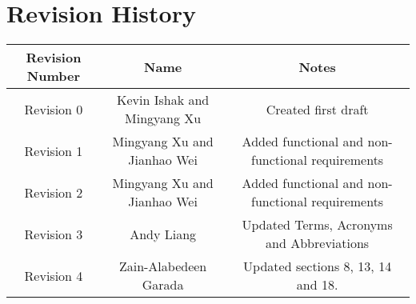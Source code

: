 \documentclass{article}
\begin{document}
\section{Revision History}
\begin{tabular}{|c|c|c|}
\hline
\textbf{Revision Number} & \textbf{Name} & \textbf{Notes} \\
\hline
Revision 0 & Kevin Ishak and Mingyang Xu & Created first draft \\
Revision 1 & Mingyang Xu and Jianhao Wei & Added functional and non-functional requirements \\
Revision 2 & Mingyang Xu and Jianhao Wei & Added functional and non-functional requirements \\
Revision 3 & Andy Liang & Updated Terms, Acronyms and Abbreviations \\
Revision 4 & Zain-Alabedeen Garada & Updated sections 8, 13, 14 and 18.\\
\hline
\end{tabular}
\end{document}
